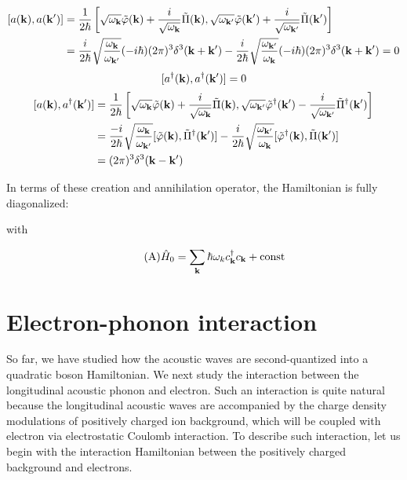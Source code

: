 \[\begin{split}
[a({\bf k}),a({\bf k'})] &= \frac{1}{2\hbar} \left[\sqrt{\omega_{\bf k}}\tilde\varphi({\bf k}) + \frac{i}{\sqrt{\omega_{\bf k}}}\tilde\Pi({\bf k}),\sqrt{\omega_{\bf k'}}\tilde\varphi({\bf k'}) + \frac{i}{\sqrt{\omega_{\bf k'}}}\tilde\Pi({\bf k'}) \right]\\
&=\frac{i}{2\hbar}\sqrt{\frac{{\omega_{\bf k}}}{{\omega_{\bf k'}}}}(-i\hbar)(2\pi)^3\delta^3({\bf k+k'}) - \frac{i}{2\hbar}\sqrt{\frac{{\omega_{\bf k'}}}{{\omega_{\bf k}}}}(-i\hbar)(2\pi)^3\delta^3({\bf k+k'}) = 0
\end{split}\]
\[[a^\dagger({\bf k}),a^\dagger({\bf k'})] = 0 \]
\[\begin{split}
[a({\bf k}),a^\dagger({\bf k'})]&= \frac{1}{2\hbar} \left[\sqrt{\omega_{\bf k}}\tilde\varphi({\bf k}) + \frac{i}{\sqrt{\omega_{\bf k}}}\tilde\Pi({\bf k}),\sqrt{\omega_{\bf k'}}\tilde\varphi^\dagger({\bf k'}) - \frac{i}{\sqrt{\omega_{\bf k'}}}\tilde\Pi^\dagger({\bf k'}) \right]\\
&=\frac{-i}{2\hbar}\sqrt{\frac{{\omega_{\bf k}}}{{\omega_{\bf k'}}}}[\tilde{\varphi}({\bf k}),\tilde{\Pi}^\dagger({\bf k'})] - \frac{i}{2\hbar}\sqrt{\frac{{\omega_{\bf k'}}}{{\omega_{\bf k}}}}[\tilde{\varphi}^\dagger({\bf k}),\tilde{\Pi}({\bf k'})]\\
&=(2\pi)^3\delta^3({\bf k-k'})
\end{split} \]

In terms of these creation and annihilation operator, the Hamiltonian is fully diagonalized: 





with

\begin{align}\tag{A}\label{5A}
\hat{H}_0 = \sum_{\bf k}\hbar\omega_k c_{\bf k}^\dagger c_{\bf k}+\text{const}
\end{align}



\section{Electron-phonon interaction} \label{se5-2}%

So far, we have studied how the acoustic waves are second-quantized into a quadratic boson Hamiltonian. We next study the interaction between the longitudinal acoustic phonon and electron. Such an interaction is quite natural because the longitudinal acoustic waves are accompanied by the charge density modulations of positively charged ion background, which will be coupled with electron via electrostatic Coulomb interaction. To describe such interaction, let us begin with the interaction Hamiltonian between the positively charged background and electrons. 

